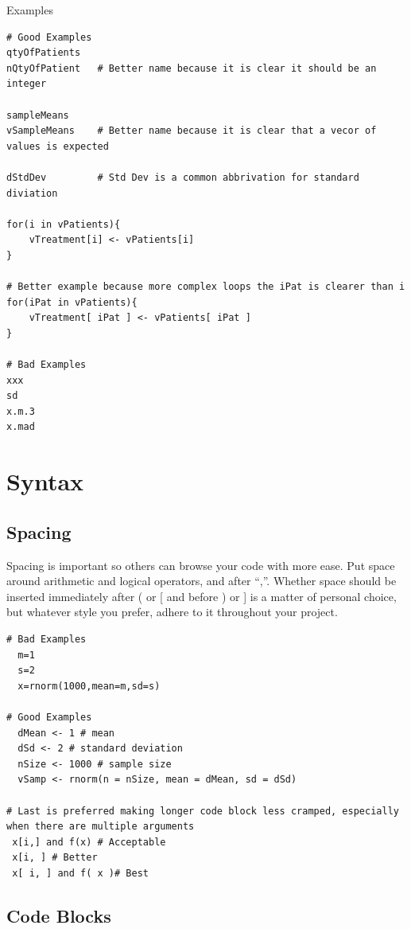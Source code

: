 \documentclass[
]{book}
\begin{document}
Examples

\begin{verbatim}
# Good Examples
qtyOfPatients 
nQtyOfPatient   # Better name because it is clear it should be an integer

sampleMeans  
vSampleMeans    # Better name because it is clear that a vecor of values is expected

dStdDev         # Std Dev is a common abbrivation for standard diviation

for(i in vPatients){
    vTreatment[i] <- vPatients[i]
}

# Better example because more complex loops the iPat is clearer than i
for(iPat in vPatients){
    vTreatment[ iPat ] <- vPatients[ iPat ]
}

# Bad Examples
xxx
sd 
x.m.3   
x.mad 
\end{verbatim}

\hypertarget{syntax}{%
\chapter{Syntax}\label{syntax}}

\hypertarget{spacing}{%
\section{Spacing}\label{spacing}}

Spacing is important so others can browse your code with more
ease. Put space around arithmetic and logical operators, and after
``,''. Whether space should be inserted immediately after ( or {[} and
before ) or {]} is a matter of personal choice, but whatever style you
prefer, adhere to it throughout your project.

\begin{verbatim}
# Bad Examples
  m=1
  s=2
  x=rnorm(1000,mean=m,sd=s)

# Good Examples
  dMean <- 1 # mean
  dSd <- 2 # standard deviation
  nSize <- 1000 # sample size
  vSamp <- rnorm(n = nSize, mean = dMean, sd = dSd)

# Last is preferred making longer code block less cramped, especially when there are multiple arguments
 x[i,] and f(x) # Acceptable
 x[i, ] # Better
 x[ i, ] and f( x )# Best
\end{verbatim}

\hypertarget{code-blocks}{%
\section{Code Blocks}\label{code-blocks}}
\end{document}
